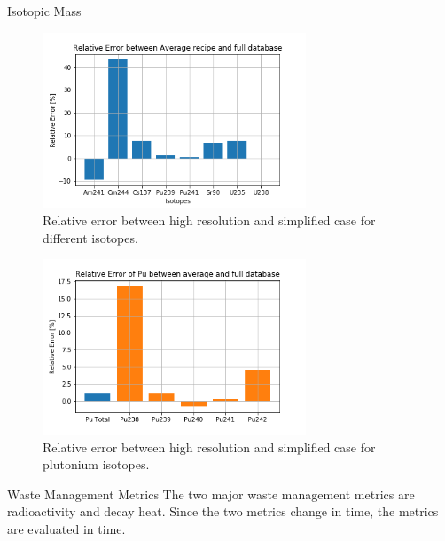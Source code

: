 \documentclass[final]{beamer}
\newlength{\onecolwid}
\newlength{\threecolwid}
\begin{document}
\begin{frame}[t]
\begin{columns}[t,totalwidth=\threecolwid]
\begin{column}{\onecolwid}
\begin{block}{Isotopic Mass}

\begin{figure}
    \centering
    \includegraphics[width=0.7\textwidth]{../images/iso_rel.png}
    \caption{Relative error between high resolution and simplified case for different isotopes.}
    \label{fig:iso_rel}
\end{figure}


\begin{figure}
    \centering
    \includegraphics[width=0.7\textwidth]{../images/pu_rel.png}
    \caption{Relative error between high resolution and simplified case for plutonium isotopes.}
    \label{fig:pu_rel}
\end{figure}
\end{block}


\begin{block}{Waste Management Metrics}
The two major waste management metrics are radioactivity and
decay heat. Since the two metrics change in time, the metrics
are evaluated in time.


\end{block}
\end{column}
\end{columns}
\end{frame}
\end{document}
